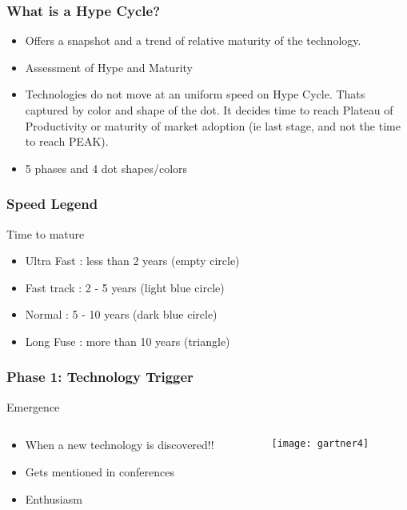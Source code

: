 \begin{frame}[fragile]\frametitle{What is a Hype Cycle?}

\begin{itemize}
\item Offers a snapshot and a trend of relative maturity of the technology.
\item Assessment of Hype and Maturity
\item Technologies do not move at an uniform speed on Hype Cycle. Thats captured by color and shape of the dot. It decides time to reach Plateau of Productivity or maturity of market adoption (ie last stage, and not the time to reach PEAK).
\item 5 phases and 4 dot shapes/colors
\end{itemize}
\end{frame}

\begin{frame}[fragile]\frametitle{Speed Legend}
Time to mature
\begin{itemize}
\item Ultra Fast : less than 2 years (empty circle)
\item Fast track : 2 - 5 years (light blue circle)
\item Normal : 5 - 10 years (dark blue circle)
\item Long Fuse : more than 10 years (triangle)
\end{itemize}
\end{frame}

\begin{frame}[fragile]\frametitle{Phase 1: Technology Trigger}


Emergence

 \begin{columns}
  \begin{column}{0.55\linewidth}
\begin{itemize}
\item When a new technology is discovered!!
\item Gets mentioned in conferences
\item Enthusiasm
\end{itemize}
  \end{column}%
  \begin{column}{0.45\linewidth}
			\begin{center}
			\texttt{[image: gartner4]}
			\end{center}
  \end{column}
 \end{columns}
 
\end{frame}

